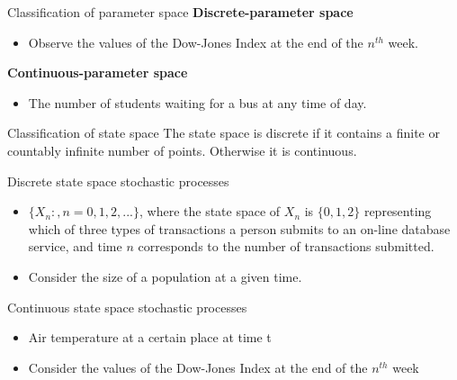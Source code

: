 \documentclass[12pt,ignorenonframetext,]{beamer}
\providecommand{\tightlist}{%
  \setlength{\itemsep}{0pt}\setlength{\parskip}{0pt}}
\begin{document}
\begin{frame}{Classification of parameter space}
\protect\hypertarget{classification-of-parameter-space-1}{}
\textbf{Discrete-parameter space}

\begin{itemize}
\tightlist
\item
  Observe the values of the Dow-Jones Index at the end of the \(n^{th}\)
  week.
\end{itemize}

\textbf{Continuous-parameter space}

\begin{itemize}
\tightlist
\item
  The number of students waiting for a bus at any time of day.
\end{itemize}
\end{frame}

\begin{frame}{Classification of state space}
\protect\hypertarget{classification-of-state-space}{}
The state space is discrete if it contains a finite or countably
infinite number of points. Otherwise it is continuous.

\begin{block}{Discrete state space stochastic processes}
\protect\hypertarget{discrete-state-space-stochastic-processes}{}
\begin{itemize}
\item
  \(\{X_n:, n=0, 1, 2, ...\}\), where the state space of \(X_n\) is
  \(\{0, 1, 2\}\) representing which of three types of transactions a
  person submits to an on-line database service, and time \(n\)
  corresponds to the number of transactions submitted.
\item
  Consider the size of a population at a given time.
\end{itemize}
\end{block}

\begin{block}{Continuous state space stochastic processes}
\protect\hypertarget{continuous-state-space-stochastic-processes}{}
\begin{itemize}
\item
  Air temperature at a certain place at time t
\item
  Consider the values of the Dow-Jones Index at the end of the
  \(n^{th}\) week
\end{itemize}
\end{block}
\end{frame}
\end{document}
